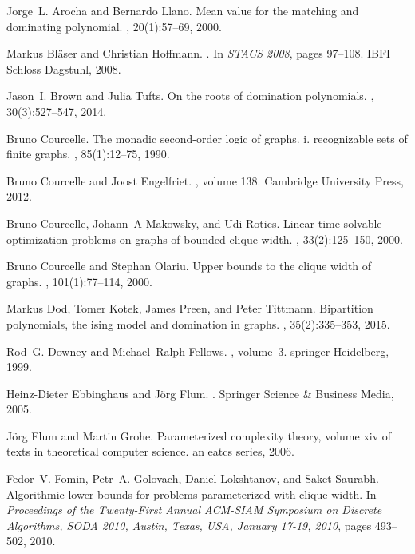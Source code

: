 \documentclass{llncs}
\begin{document}
\begin{thebibliography}{10}
Jorge~L. Arocha and Bernardo Llano.
\newblock Mean value for the matching and dominating polynomial.
, 20(1):57--69, 2000.

Markus Bl{\"a}ser and Christian Hoffmann.
.
\newblock In {\em {STACS 2008}}, pages 97--108. {IBFI Schloss Dagstuhl}, 2008.

Jason~I. Brown and Julia Tufts.
\newblock On the roots of domination polynomials.
, 30(3):527--547, 2014.

Bruno Courcelle.
\newblock The monadic second-order logic of graphs. i. recognizable sets of
  finite graphs.
, 85(1):12--75, 1990.

Bruno Courcelle and Joost Engelfriet.
, volume 138.
\newblock Cambridge University Press, 2012.

Bruno Courcelle, Johann~A Makowsky, and Udi Rotics.
\newblock Linear time solvable optimization problems on graphs of bounded
  clique-width.
, 33(2):125--150, 2000.

Bruno Courcelle and Stephan Olariu.
\newblock Upper bounds to the clique width of graphs.
, 101(1):77--114, 2000.

Markus Dod, Tomer Kotek, James Preen, and Peter Tittmann.
\newblock Bipartition polynomials, the ising model and domination in graphs.
, 35(2):335--353, 2015.

Rod~G. Downey and Michael~Ralph Fellows.
, volume~3.
\newblock springer Heidelberg, 1999.

Heinz-Dieter Ebbinghaus and J{\"o}rg Flum.
.
\newblock Springer Science \& Business Media, 2005.

J{\"o}rg Flum and Martin Grohe.
\newblock Parameterized complexity theory, volume xiv of texts in theoretical
  computer science. an eatcs series, 2006.

Fedor~V. Fomin, Petr~A. Golovach, Daniel Lokshtanov, and Saket Saurabh.
\newblock Algorithmic lower bounds for problems parameterized with
  clique-width.
\newblock In {\em Proceedings of the Twenty-First Annual {ACM-SIAM} Symposium
  on Discrete Algorithms, {SODA} 2010, Austin, Texas, USA, January 17-19,
  2010}, pages 493--502, 2010.


\end{thebibliography}
\end{document}
